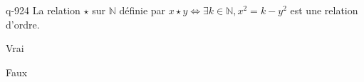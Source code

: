 \begin{truefalse}{q-924}
La relation $\star$ sur $\mathbb N$ définie par $x\star y \iff \exists k\in\mathbb N, x^2=k-y^2$ est une relation d'ordre.
\item Vrai
\item* Faux
\end{truefalse}

